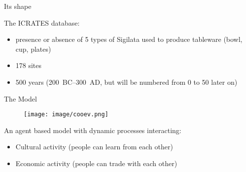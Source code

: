 \documentclass[10pt, notes=show]{beamer}
\begin{document}
\begin{frame}{Its shape}

    The ICRATES database:
    \begin{itemize}
        \item presence or absence of 5 types of Sigilata used to produce tableware (bowl, cup, plates)
        \item 178 sites
        \item 500 years (200~BC--300~AD, {\small but will be numbered from 0 to 50 later on})

    \end{itemize}
\end{frame}

\begin{frame}{The Model}
    \begin{figure}[h]
        \centering
        \texttt{[image: image/cooev.png]}
    \end{figure}
    An agent based model with dynamic processes interacting:
    \begin{itemize}
        \item Cultural activity (people can learn from each other)
        \item Economic activity (people can trade with each other)
    \end{itemize}

\end{frame}

\begin{frame}
    
\end{frame}
\end{document}
